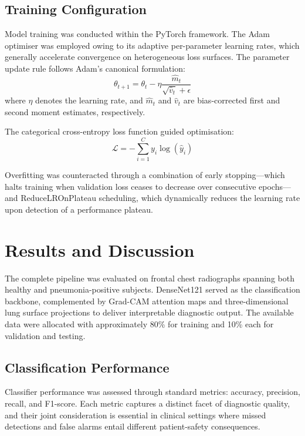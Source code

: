 \documentclass[conference]{IEEEtran}
\begin{document}
\subsection{Training Configuration}
Model training was conducted within the PyTorch framework. The Adam optimiser was employed owing to its adaptive per-parameter learning rates, which generally accelerate convergence on heterogeneous loss surfaces. The parameter update rule follows Adam's canonical formulation:
\begin{equation}
\theta_{t+1} = \theta_t - \eta \frac{\hat{m}_t}{\sqrt{\hat{v}_t} + \epsilon}
\end{equation}
where \( \eta \) denotes the learning rate, and \( \hat{m}_t \) and \( \hat{v}_t \) are bias-corrected first and second moment estimates, respectively.

The categorical cross-entropy loss function guided optimisation:
\begin{equation}
\mathcal{L} = -\sum_{i=1}^{C} y_i \log(\hat{y}_i)
\end{equation}

Overfitting was counteracted through a combination of early stopping---which halts training when validation loss ceases to decrease over consecutive epochs---and ReduceLROnPlateau scheduling, which dynamically reduces the learning rate upon detection of a performance plateau.

\section{Results and Discussion}

The complete pipeline was evaluated on frontal chest radiographs spanning both healthy and pneumonia-positive subjects. DenseNet121 served as the classification backbone, complemented by Grad-CAM attention maps and three-dimensional lung surface projections to deliver interpretable diagnostic output. The available data were allocated with approximately 80\% for training and 10\% each for validation and testing.

\subsection{Classification Performance}
Classifier performance was assessed through standard metrics: accuracy, precision, recall, and F1-score. Each metric captures a distinct facet of diagnostic quality, and their joint consideration is essential in clinical settings where missed detections and false alarms entail different patient-safety consequences.
\end{document}
